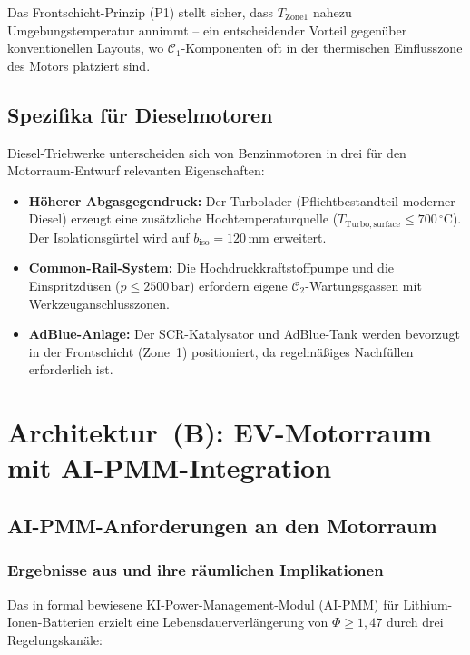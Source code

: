 ﻿\documentclass[12pt,a4paper]{article}
\begin{document}
Das Frontschicht-Prinzip (P1) stellt sicher, dass $T_\mathrm{Zone1}$ nahezu
Umgebungstemperatur annimmt -- ein entscheidender Vorteil gegenüber konventionellen
Layouts, wo $\mathcal{C}_1$-Komponenten oft in der thermischen Einflusszone des
Motors platziert sind.

\subsection{Spezifika für Dieselmotoren}

Diesel-Triebwerke unterscheiden sich von Benzinmotoren in drei für den
Motorraum-Entwurf relevanten Eigenschaften:

\begin{itemize}[leftmargin=*]
	\item \textbf{Höherer Abgasgegendruck:} Der Turbolader (Pflichtbestandteil
	moderner Diesel) erzeugt eine zusätzliche Hochtemperaturquelle
	($T_\mathrm{Turbo,surface} \leq 700\,^\circ\mathrm{C}$). Der Isolationsgürtel
	wird auf $b_\mathrm{iso} = 120\,\mathrm{mm}$ erweitert.
	\item \textbf{Common-Rail-System:} Die Hochdruckkraftstoffpumpe und die
	Einspritzdüsen ($p \leq 2500\,\mathrm{bar}$) erfordern eigene
	$\mathcal{C}_2$-Wartungsgassen mit Werkzeuganschlusszonen.
	\item \textbf{AdBlue-Anlage:} Der SCR-Katalysator und AdBlue-Tank werden
	bevorzugt in der Frontschicht (Zone~1) positioniert, da regelmäßiges
	Nachfüllen erforderlich ist.
\end{itemize}

\section{Architektur~(B): EV-Motorraum mit AI-PMM-Inte\-gration}
\label{sec:architektur_b}

\subsection{AI-PMM-Anforderungen an den Motorraum}

\subsubsection{Ergebnisse aus \cite{Epp2026liion} und ihre räumlichen Implikationen}

Das in \cite{Epp2026liion} formal bewiesene KI-Power-Management-Modul (AI-PMM)
für Lithium-Ionen-Batterien erzielt eine Lebensdauerverlängerung von
$\Phi \geq 1{,}47$ durch drei Regelungskanäle:
\end{document}
